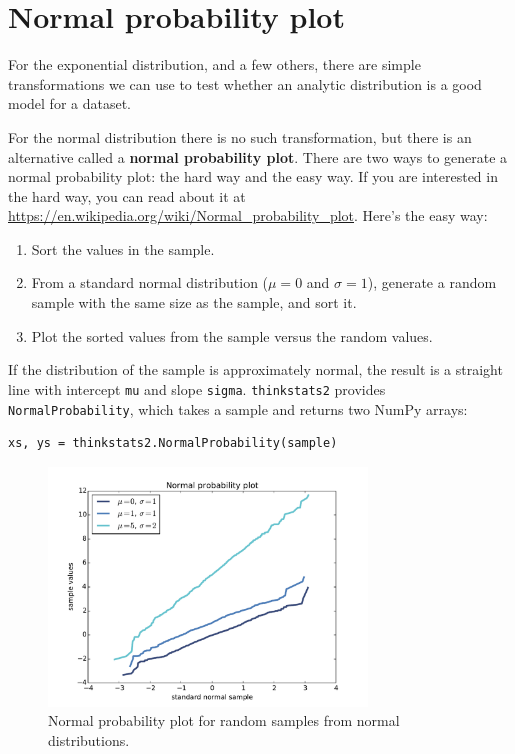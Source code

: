 \documentclass[12pt]{book}
\begin{document}
\section{Normal probability plot}

For the exponential distribution, and a few others, there are
simple transformations we can use to test whether an analytic
distribution is a good model for a dataset.

For the normal distribution there is no such transformation, but there
is an alternative called a {\bf normal probability plot}.  There
are two ways to generate a normal probability plot: the hard way
and the easy way.  If you are interested in the hard way, you can
read about it at \url{https://en.wikipedia.org/wiki/Normal_probability_plot}.
Here's the easy way:

\begin{enumerate}

\item Sort the values in the sample.

\item From a standard normal distribution ($\mu=0$ and $\sigma=1$),
generate a random sample with the same size as the sample, and sort it.

\item Plot the sorted values from the sample versus the random values.

\end{enumerate}

If the distribution of the sample is approximately normal, the result
is a straight line with intercept {\tt mu} and slope {\tt sigma}.
{\tt thinkstats2} provides {\tt NormalProbability}, which takes a
sample and returns two NumPy arrays:

\begin{verbatim}
xs, ys = thinkstats2.NormalProbability(sample)
\end{verbatim}

\begin{figure}
\centerline{\includegraphics[height=2.5in]{figs/analytic_normal_prob_example.pdf}}
\caption{Normal probability plot for random samples from normal distributions.}
\label{analytic_normal_prob_example}
\end{figure}
\end{document}
